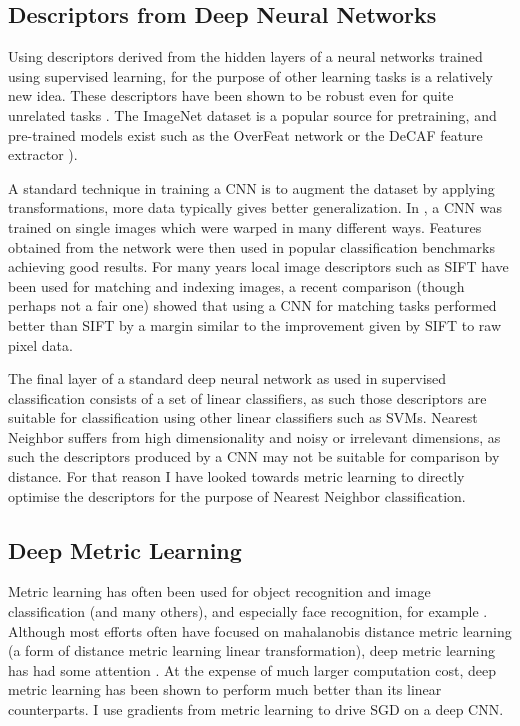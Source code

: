 \subsection {Descriptors from Deep Neural Networks}

Using descriptors derived from the hidden layers of a neural networks trained using supervised learning, for the purpose of other learning tasks is a relatively new idea. These descriptors have been shown to be robust even for quite unrelated tasks \cite{Donahue2014,Razavian2014}. The ImageNet dataset \cite{Krizhevsky2012} is a popular source for pretraining, and pre-trained models exist such as the OverFeat network \cite{Sermanet2013} or the DeCAF feature extractor \cite{Donahue2014}). 

A standard technique in training a \gls{CNN} is to augment the dataset by applying transformations, more data typically gives better generalization. In \cite{Dosovitskiy2013}, a \gls{CNN} was trained on single images which were warped in many different ways. Features obtained from the network were then used in popular classification benchmarks achieving good results. For many years local image descriptors such as \gls{SIFT} \cite{Lowe2004} have been used for matching and indexing images, a recent comparison \cite{Fischer2014} (though perhaps not a fair one) showed that using a \gls{CNN} for matching tasks performed better than \gls{SIFT} by a margin similar to the improvement given by \gls{SIFT} to raw pixel data.


The final layer of a standard deep neural network as used in supervised classification consists of a set of linear classifiers, as such those descriptors are suitable for classification using other linear classifiers such as \gls{SVM}s. Nearest Neighbor suffers from high dimensionality and noisy or irrelevant dimensions, as such the descriptors produced by a CNN may not be suitable for comparison by distance. For that reason I have looked towards metric learning to directly optimise the descriptors for the purpose of Nearest Neighbor classification. 


\subsection {Deep Metric Learning}


Metric learning has often been used for object recognition and image classification \cite{Hadsell2006,Min2009} (and many others), and especially face recognition, for example \cite{Kostinger2012}. Although most efforts often have focused on mahalanobis distance metric learning (a form of distance metric learning linear transformation), deep metric learning has had some attention \cite {Salakhutdinov2007a,Min2009,Weston2009,Min2010}. At the expense of much larger computation cost, deep metric learning has been shown to perform much better than its linear counterparts. I use gradients from metric learning to drive \gls{SGD} on a deep \gls{CNN}. 

